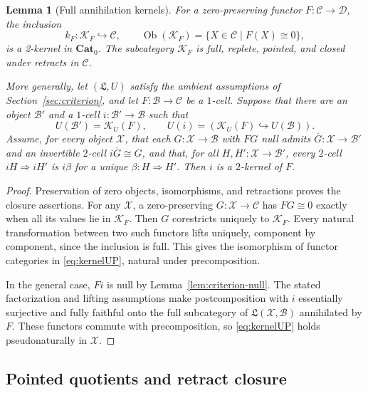 \documentclass[11pt,reqno,a4paper]{amsart}
\newtheorem{lemma}[theorem]{Lemma}
\theoremstyle{definition}
\theoremstyle{remark}
\newcommand{\C}{\mathcal{C}}
\newcommand{\D}{\mathcal{D}}
\newcommand{\0}{\mathbf{0}}
\renewcommand{\1}{\mathbf{1}}
\newcommand{\iso}{\cong}
\newcommand{\Pt}{\mathbf{Cat}_{0}}
\newcommand{\Lcat}{\mathfrak L}
\newcommand{\B}{\mathcal B}
\newcommand{\K}{\mathcal K}
\newcommand{\X}{\mathcal X}
\DeclareMathOperator{\Ob}{Ob}
\begin{document}
\begin{lemma}[Full annihilation kernels]\label{lem:annihilation}
For a zero-preserving functor $F:\C\to\D$, the inclusion
\begin{equation}\label{eq:KF}
 k_F:\K_F\hookrightarrow\C,
 \qquad \Ob(\K_F)=\{X\in\C\mid F(X)\iso0\},
\end{equation}
is a 2-kernel in $\Pt$. The subcategory $\K_F$ is full, replete,
pointed, and closed under retracts in $\C$.

More generally, let $(\Lcat,U)$ satisfy the ambient assumptions of
Section~\ref{sec:criterion}, and let $F:\B\to\C$ be a
$1$-cell. Suppose that there are an object $\B'$ and a
$1$-cell $i:\B'\to\B$ such that
\[
 U(\B')=\mathcal K_U(F),\qquad
 U(i)=(\mathcal K_U(F)\hookrightarrow U(\B)).
\]
Assume, for every object $\X$, that each $G:\X\to\B$ with
$FG$ null admits $\overline G:\X\to\B'$ and an invertible
$2$-cell $i\overline G\iso G$, and that, for all
$H,H':\X\to\B'$, every $2$-cell $iH\Rightarrow iH'$
is $i\beta$ for a unique $\beta:H\Rightarrow H'$.
Then $i$ is a $2$-kernel of $F$.
\end{lemma}
\begin{proof}
Preservation of zero objects, isomorphisms, and retractions proves the
closure assertions. For any $\X$, a zero-preserving $G:\X\to\C$
has $FG\iso0$ exactly when all its values lie in $\K_F$. Then $G$
corestricts uniquely to $\K_F$. Every natural transformation between two
such functors lifts uniquely, component by component, since the inclusion
is full. This gives the isomorphism of functor categories in
\eqref{eq:kernelUP}, natural under precomposition.

In the general case, $Fi$ is null by
Lemma~\ref{lem:criterion-null}. The stated factorization and lifting
assumptions make postcomposition with $i$ essentially surjective and
fully faithful onto the full subcategory of $\Lcat(\X,\B)$
annihilated by $F$. These functors commute with precomposition, so
\eqref{eq:kernelUP} holds pseudonaturally in $\X$.
\end{proof}

\subsection{Pointed quotients and retract closure}
\end{document}
